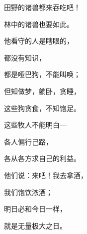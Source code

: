 {\par }{\Q {}田野的诸兽都来吞吃吧！
\par }{\Q 林中的诸兽也要如此。
\par }{\Q {}他看守的人是瞎眼的，
\par }{\Q 都没有知识，
\par }{\Q 都是哑巴狗，不能叫唤；
\par }{\Q 但知做梦，躺卧，贪睡，
\par }{\Q {}这些狗贪食，不知饱足。
\par }{\Q 这些牧人不能明白—
\par }{\Q 各人偏行己路，
\par }{\Q 各从各方求自己的利益。
\par }{\Q {}他们说：来吧！我去拿酒，
\par }{\Q 我们饱饮浓酒；
\par }{\Q 明日必和今日一样，
\par }{\Q 就是{}无量极大之日。

}
